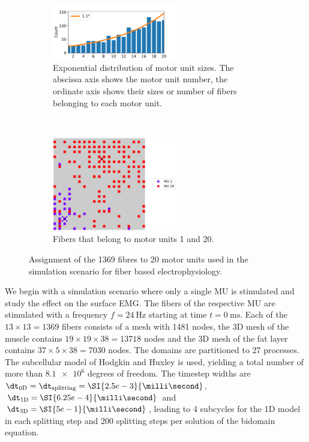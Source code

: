 \begin{figure}[H]
  \centering%
  \begin{subfigure}[t]{\textwidth}%
    \centering%
    \includegraphics[width=0.6\textwidth]{images/results/application/MU_fibre_distribution_37x37_20c_txt_fiber_distribution_.pdf}%
    \caption{Exponential distribution of motor unit sizes. The abscissa axis shows the motor unit number, the ordinate axis shows their sizes or number of fibers belonging to each motor unit.}%
    \label{fig:MU_fibre_distribution_37x37_20c_txt_fiber_distribution}%
  \end{subfigure}\\
  \begin{subfigure}[t]{\textwidth}%
    \centering%
    \includegraphics[width=0.6\textwidth]{images/results/application/MU_fibre_distribution_37x37_20c_txt_2d_fiber_distribution_.pdf}%
    \caption{Fibers that belong to motor units 1 and 20.}%
    \label{fig:MU_fibre_distribution_37x37_20c_txt_2d_fiber_distribution}%
  \end{subfigure}
  \caption{Assignment of the 1369 fibres to 20 motor units used in the simulation scenario for fiber based electrophysiology.}%
  \label{fig:MU_fibre_distribution_37x37_20c}%
\end{figure}%

We begin with a simulation scenario where only a single MU is stimulated and study the effect on the surface EMG. The fibers of the respective MU are stimulated with a frequency $f=\SI{24}{\hertz}$ starting at time $t=\SI{0}{\milli\second}$. 
Each of the $13\times 13=\num{1369}$ fibers consists of a mesh with 1481 nodes, the 3D mesh of the muscle contains $19 \times 19 \times 38 = \num{13718}$ nodes and the 3D mesh of the fat layer contains $37 \times 5 \times 38 = \num{7030}$ nodes. The domains are partitioned to 27 processes. The subcellular model of Hodgkin and Huxley is used, yielding a total number of more than $\num{8.1e6}$ degrees of freedom. 
The timestep widths are $\dt_\text{0D}=\dt_\text{splitting} = \SI{2.5e-3}{\milli\second}$, $\dt_\text{1D} = \SI{6.25e-4}{\milli\second}$ and $\dt_\text{3D} = \SI{5e-1}{\milli\second}$, leading to 4 subcycles for the 1D model in each splitting step and 200 splitting steps per solution of the bidomain equation.

